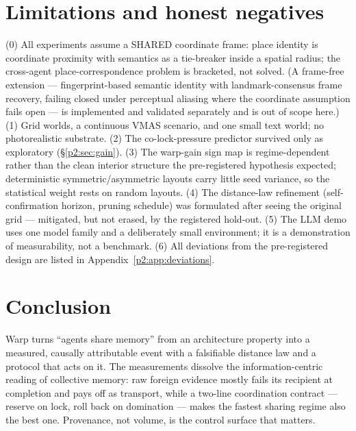 \documentclass{article}
\begin{document}
\section{Limitations and honest negatives}
\label{p2:sec:limits}

(0) All experiments assume a SHARED coordinate frame: place identity
is coordinate proximity with semantics as a tie-breaker inside a
spatial radius; the cross-agent place-correspondence problem is
bracketed, not solved. (A frame-free extension --- fingerprint-based
semantic identity with landmark-consensus frame recovery, failing
closed under perceptual aliasing where the coordinate assumption fails
open --- is implemented and validated separately and is out of scope
here.) (1) Grid worlds, a continuous VMAS scenario, and one small text
world; no photorealistic substrate. (2) The
co-lock-pressure predictor survived only as exploratory
(\S\ref{p2:sec:gain}). (3) The warp-gain sign map is regime-dependent
rather than the clean interior structure the pre-registered
hypothesis expected; deterministic symmetric/asymmetric layouts carry
little seed variance, so the statistical weight rests on random
layouts. (4) The distance-law refinement (self-confirmation horizon,
pruning schedule) was formulated after seeing the original grid ---
mitigated, but not erased, by the registered hold-out. (5) The LLM
demo uses one model family and a deliberately small environment; it is
a demonstration of measurability, not a benchmark. (6) All deviations
from the pre-registered design are listed in
Appendix~\ref{p2:app:deviations}.

\section{Conclusion}

Warp turns ``agents share memory'' from an architecture property into
a measured, causally attributable event with a falsifiable distance
law and a protocol that acts on it. The measurements dissolve the
information-centric reading of collective memory: raw foreign evidence
mostly fails its recipient at completion and pays off as transport,
while a two-line coordination contract --- reserve on lock, roll back
on domination --- makes the fastest sharing regime also the best one.
Provenance, not volume, is the control surface that matters.
\end{document}
